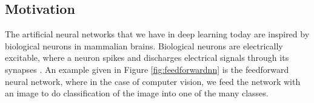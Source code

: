 

\subsection*{Motivation}

The artificial neural networks that we have in deep learning today are inspired by biological neurons in mammalian brains. Biological neurons are electrically excitable, where a neuron spikes and discharges electrical signals through its synapses
.
An example given in Figure \ref{fig:feedforwardnn} is the feedforward neural network, where in the case of computer vision, we feed the network with an image to do classification of the image into one of the many classes.


